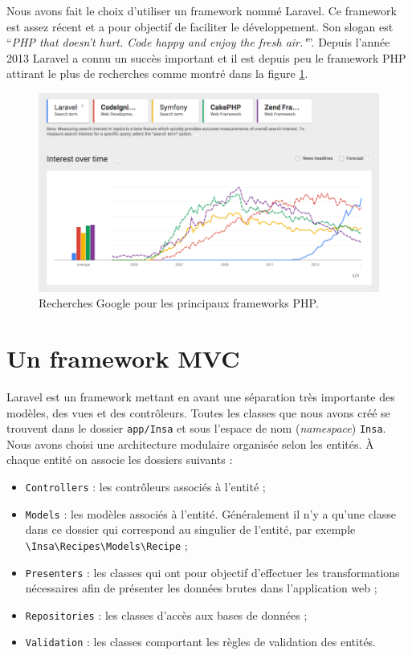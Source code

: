 Nous avons fait le choix d'utiliser un framework nommé Laravel. Ce framework est assez récent et a pour objectif de faciliter le développement. Son slogan est \enquote{\textit{PHP that doesn't hurt. Code happy and enjoy the fresh air."}}. Depuis l'année 2013 Laravel a connu un succès important et il est depuis peu le framework PHP attirant le plus de recherches comme montré dans la figure \ref{fig:trends-php-frameworks}.

\begin{figure}[H]
	\centering
	\includegraphics[width=1\textwidth]{images/trends-php-frameworks.png}
	\caption{Recherches Google pour les principaux frameworks PHP.}
	\label{fig:trends-php-frameworks}
\end{figure}

\section{Un framework MVC}
	Laravel est un framework mettant en avant une séparation très importante des modèles, des vues et des contrôleurs. Toutes les classes que nous avons créé se trouvent dans le dossier \verb|app/Insa| et sous l'espace de nom (\textit{namespace}) \verb|Insa|.\\

	Nous avons choisi une architecture modulaire organisée selon les entités. À chaque entité on associe les dossiers suivants :
	\begin{itemize}
		\item \verb|Controllers| : les contrôleurs associés à l'entité ;
		\item \verb|Models| : les modèles associés à l'entité. Généralement il n'y a qu'une classe dans ce dossier qui correspond au singulier de l'entité, par exemple \verb|\Insa\Recipes\Models\Recipe| ;
		\item \verb|Presenters| : les classes qui ont pour objectif d'effectuer les transformations nécessaires afin de présenter les données brutes dans l'application web ;
		\item \verb|Repositories| : les classes d'accès aux bases de données ;
		\item \verb|Validation| : les classes comportant les règles de validation des entités.
	\end{itemize}

